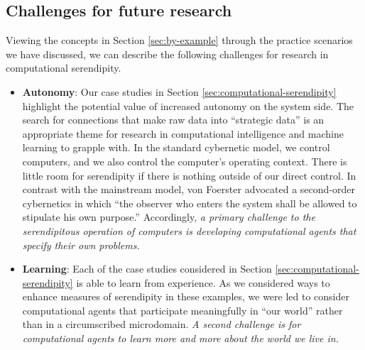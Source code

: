 \subsection{Challenges for future research} \label{sec:recommendations}

Viewing the concepts in Section \ref{sec:by-example} through the
practice scenarios we have discussed, we can describe the following
challenges for research in computational serendipity.

\begin{itemize}
\item \textbf{Autonomy}: Our case studies in Section
  \ref{sec:computational-serendipity} highlight the potential value of
  increased autonomy on the system side.
The search for connections that make raw data into ``strategic data''
is an appropriate theme for research in computational intelligence and
machine learning to grapple with.  In the standard cybernetic model,
we control computers, and we also control the computer's operating
context.  There is little room for serendipity if there is nothing
outside of our direct control.  In contrast with the mainstream model,
von Foerster \citeyear[p. 286]{von2003cybernetics} advocated a
second-order cybernetics in which ``the observer who enters the system
shall be allowed to stipulate his own purpose.''  Accordingly, \emph{a
  primary challenge to the serendipitous operation of computers is
  developing computational agents that specify their own problems.}
\end{itemize}

\begin{itemize}
\item \textbf{Learning}: Each of the case studies considered in
  Section \ref{sec:computational-serendipity} is able to learn from
  experience.  As we considered ways to enhance measures of
  serendipity in these examples, we were led to consider computational
  agents that participate meaningfully in ``our world'' rather than in
  a circumscribed microdomain.  \emph{A second challenge is for
    computational agents to learn more and more about the world we
    live in.}
\end{itemize}


